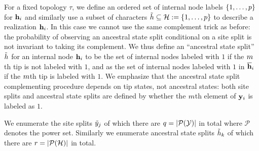 For a fixed topology $\tau$, we define an ordered set of internal node labels $\{1,\ldots,p\}$ for $\mathbf{h}_i$ and similarly use a subset of characters $\tilde{h}\subseteq\mathcal{H}:=\{1,\ldots,p\}$ to describe a realization $\mathbf{h}_i$.
In this case we cannot use the same complement trick as before: the probability of observing an ancestral state split conditional on a site split is not invariant to taking its complement.
We thus define an ``ancestral state split'' $\tilde{h}$ for an internal node $\mathbf{h}_i$ to be the set of internal nodes labeled with $1$ if the $m$th tip is not labeled with $1$, and as the set of internal nodes labeled with $1$ in $\overline{\mathbf{h}}_i$ if the $m$th tip is labeled with $1$.
We emphasize that the ancestral state split complementing procedure depends on tip states, not ancestral states: both site splits and ancestral state splits are defined by whether the $m$th element of $\mathbf{y}_i$ is labeled as $1$.

We enumerate the site splits $\tilde{y}_j$ of which there are $q=|\mathcal{P}(\mathcal{Y})|$ in total where $\mathcal{P}$ denotes the power set.
Similarly we enumerate ancestral state splits $\tilde{h}_k$ of which there are $r=|\mathcal{P}(\mathcal{H})|$ in total.

